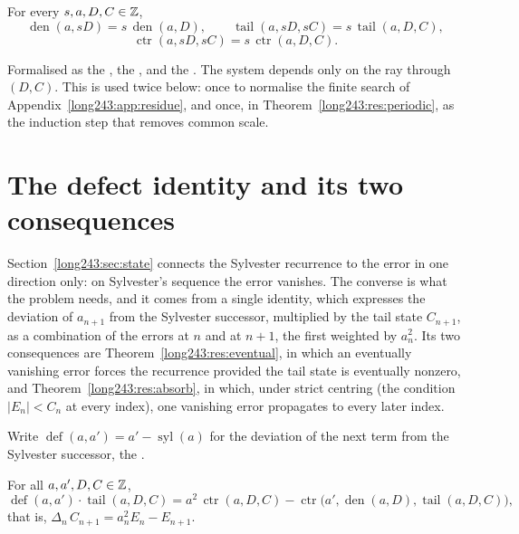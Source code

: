\documentclass[11pt]{article}
\newcommand{\sylnext}{\operatorname{syl}}
\newcommand{\den}{\operatorname{den}}
\newcommand{\tail}{\operatorname{tail}}
\newcommand{\ctr}{\operatorname{ctr}}
\newcommand{\defect}{\operatorname{def}}
\begin{document}
\begin{proposition}\label{long243:res:scale}
For every $s,a,D,C\in\mathbb{Z}$,
\[
 \den(a,sD)=s\,\den(a,D),\qquad
 \tail(a,sD,sC)=s\,\tail(a,D,C),
\]
\[
 \ctr(a,sD,sC)=s\,\ctr(a,D,C).
\]
\end{proposition}

\noindent Formalised as the
, the
, and the
.  The system depends only on the ray through $(D,C)$.  This is
used twice below: once to normalise the finite search of
Appendix~\ref{long243:app:residue}, and once, in Theorem~\ref{long243:res:periodic}, as the
induction step that removes common scale.

\section{The defect identity and its two consequences}\label{long243:sec:defect}

Section~\ref{long243:sec:state} connects the Sylvester recurrence to the error in one
direction only: on Sylvester's sequence the error vanishes.  The converse is
what the problem needs, and it comes from a single identity, which expresses
the deviation of $a_{n+1}$
from the Sylvester successor, multiplied by the tail state $C_{n+1}$, as a
combination of the errors at $n$ and at $n+1$, the first weighted by
$a_n^{2}$.  Its two consequences are
Theorem~\ref{long243:res:eventual}, in which an eventually vanishing error forces the
recurrence provided the tail state is eventually nonzero, and
Theorem~\ref{long243:res:absorb}, in which, under strict centring (the condition
$|E_n|<C_n$ at every index), one vanishing error propagates to every later
index.

Write $\defect(a,a')=a'-\sylnext(a)$ for the deviation of the next term from
the Sylvester successor, the
.

\begin{theorem}\label{long243:res:defect}
For all $a,a',D,C\in\mathbb{Z}$,
\[
 \defect(a,a')\cdot\tail(a,D,C)
 =a^{2}\,\ctr(a,D,C)-\ctr\bigl(a',\den(a,D),\tail(a,D,C)\bigr),
\]
that is, $\Delta_n\,C_{n+1}=a_n^{2}E_n-E_{n+1}$.
\end{theorem}
\end{document}
